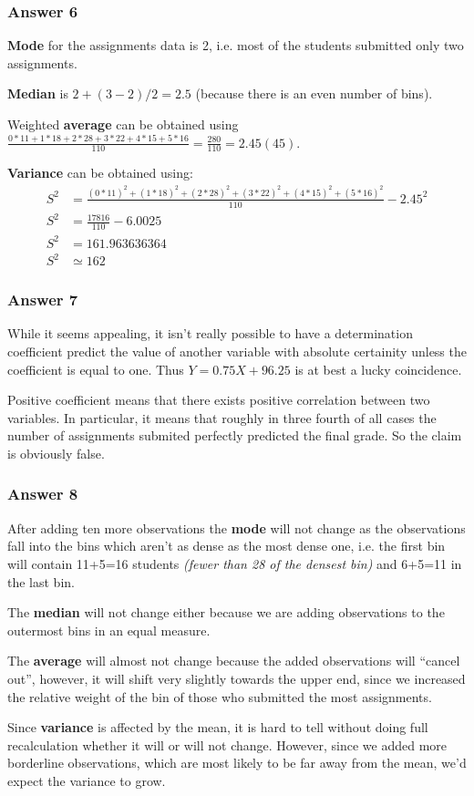 \documentclass[11pt]{article}
\begin{document}
\subsubsection{Answer 6}
\label{sec-1-2-2}
\textbf{Mode} for the assignments data is 2, i.e. most of the students submitted
only two assignments.

\textbf{Median} is $2+(3-2)/2=2.5$ (because there is an even number of bins).

Weighted \textbf{average} can be obtained using
$\frac{0*11+1*18+2*28+3*22+4*15+5*16}{110}=\frac{280}{110}=2.45(45)$.

\textbf{Variance} can be obtained using:
\begin{equation*}
  \begin{aligned}
    S^2 &= \frac{(0 * 11)^2 + (1 * 18)^2 + (2 * 28)^2 +
      (3 * 22)^2 + (4 * 15)^2 + (5 * 16)^2}{110} - 2.45^2 \\
    S^2 &= \frac{17816}{110} - 6.0025 \\
    S^2 &= 161.963636364 \\
    S^2 &\simeq 162
  \end{aligned}
\end{equation*}

\subsubsection{Answer 7}
\label{sec-1-2-3}
While it seems appealing, it isn't really possible to have a determination
coefficient predict the value of another variable with absolute certainity
unless the coefficient is equal to one.  Thus $Y = 0.75X + 96.25$ is at best
a lucky coincidence.

Positive coefficient means that there exists positive correlation between
two variables.  In particular, it means that roughly in three fourth of all
cases the number of assignments submited perfectly predicted the final grade.
So the claim is obviously false.
\subsubsection{Answer 8}
\label{sec-1-2-4}
After adding ten more observations the \textbf{mode} will not change as the
observations fall into the bins which aren't as dense as the most dense one,
i.e. the first bin will contain 11+5=16 students
\emph{(fewer than 28 of the densest bin)} and 6+5=11 in the last bin.

The \textbf{median} will not change either because we are adding observations to
the outermost bins in an equal measure.

The \textbf{average} will almost not change because the added observations will
``cancel out'', however, it will shift very slightly towards the upper
end, since we increased the relative weight of the bin of those who
submitted the most assignments.

Since \textbf{variance} is affected by the mean, it is hard to tell without
doing full recalculation whether it will or will not change.  However,
since we added more borderline observations, which are most likely to
be far away from the mean, we'd expect the variance to grow.
\end{document}
